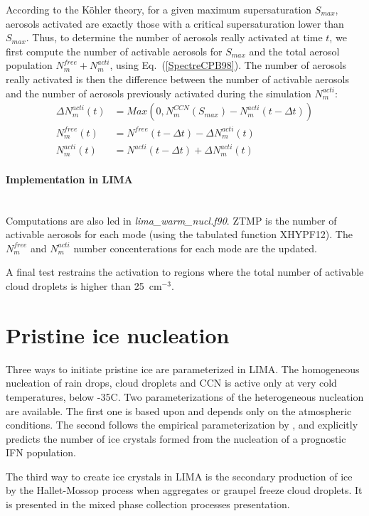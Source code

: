 According to the K\"{o}hler theory, for a given maximum supersaturation $S_{max}$, aerosols activated are exactly those with a critical supersaturation lower than $S_{max}$. Thus, to determine the number of aerosols really activated at time $t$, we first compute the number of activable aerosols for $S_{max}$ and the total aerosol population $N^{free}_m+N^{acti}_m$, using Eq.\ (\ref{SpectreCPB98}). The number of aerosols really activated is then the difference between the number of activable aerosols and the number of aerosols previously activated during the simulation $N^{acti}_m$:
\begin{align}
  \Delta N_m^{acti}(t) &= Max(0,N_m^{CCN}(S_{max})-N^{acti}_m(t-\Delta t)) \\
  N^{free}_m(t) &= N^{free}(t-\Delta t)-\Delta N_m^{acti}(t) \\ 
  N^{acti}_m(t) &= N^{acti}(t-\Delta t)+\Delta N_m^{acti}(t) 
\end{align}

\paragraph{Implementation in LIMA}
~\\
Computations are also led in \emph{lima\_warm\_nucl.f90}. ZTMP is the number of activable aerosols for each mode (using the tabulated function XHYPF12). The $N^{free}_m$ and $N^{acti}_m$ number concenterations for each mode are the updated.

A final test restrains the activation to regions where the total number of activable cloud droplets is higher than 25~cm$^{-3}$.




\section{Pristine ice nucleation}

Three ways to initiate pristine ice are parameterized in LIMA. The homogeneous nucleation of rain drops, cloud droplets and CCN is active only at very cold temperatures, below -35\textdegree C. Two parameterizations of the heterogeneous nucleation are available. The first one is based upon \citet{Meyers1992} and depends only on the atmospheric conditions. The second follows the empirical parameterization by \citet{Phillips2008}, and explicitly predicts the number of ice crystals formed from the nucleation of a prognostic IFN population.

The third way to create ice crystals in LIMA is the secondary production of ice by the Hallet-Mossop process when aggregates or graupel freeze cloud droplets. It is presented in the mixed phase collection processes presentation.

